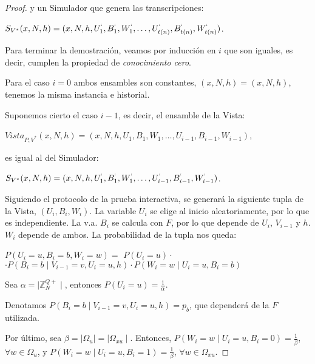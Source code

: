 \begin{proof}
	  y un Simulador que genera las transcripciones:
	  
	  \begin{center}
	  	$S_{V^*}(x,N,h)= (x,N,h,U_1^`,B_1^`,W_1^`,\dots , U_{t(n)}^`, B_{t(n)}^`, W_{t(n)}^`)$.
	  \end{center}
	
	Para terminar la demostración, veamos por inducción en $i$ que son iguales, es decir, cumplen la propiedad de \textit{conocimiento cero}.
	
	\hfil
	
	Para el caso $i=0$ ambos ensambles son constantes, $(x,N,h)=(x,N,h)$, tenemos la misma instancia e historial.
	
	\hfil
	
	Suponemos cierto el caso $i-1$, es decir, el ensamble de la Vista:
	
	 \begin{center}
		$Vista_{P,V^*}(x,N,h) = (x,N,h,U_1,B_1,W_1,\dots , U_{i-1}, B_{i-1}, W_{i-1})$,
	\end{center}
	
	es igual al del Simulador:
	
	\begin{center}
		$S_{V^*}(x,N,h)= (x,N,h,U_1^`,B_1^`,W_1^`,\dots , U_{i-1}^`, B_{i-1}^`, W_{i-1}^`)$.
	\end{center}
	
	\hfill

	Siguiendo el protocolo de la prueba interactiva, se generará la siguiente tupla de la Vista, $(U_i, B_i, W_i)$. La variable $U_i$ se elige al inicio aleatoriamente, por lo que es independiente. La v.a. $B_i$ se calcula con $F$, por lo que depende de $U_i$, $V_{i-1}$ y $h$. $W_i$ depende de ambos. La probabilidad de la tupla nos queda:
	
	\begin{flushleft}
		$P(U_i=u, B_i=b, W_i=w) = $ 	$P(U_i=u)\cdot$ \\ 
	 	$ \cdot P(B_i=b \mid V_{i-1}=v, U_i=u,h) \cdot P(W_i=w \mid U_i=u, B_i=b)$
	\end{flushleft}
	
	\hfil
	
	Sea $\alpha = \mid \mathbb{Z}^{Q+}_N \mid $, entonces $P(U_i=u) = \frac{1}{\alpha}$.
	
	Denotamos $ P(B_i=b \mid V_{i-1}=v, U_i=u,h)=p_b$, que dependerá de la $F$ utilizada.
	
	Por último, sea $\beta = \mid \Omega_u \mid = \mid \Omega_{xu} \mid $. Entonces, $P(W_i=w \mid U_i=u, B_i=0) = \frac{1}{\beta}$, $\forall w \in \Omega_u$, y $P(W_i=w \mid U_i=u, B_i=1) = \frac{1}{\beta}$, $\forall w \in \Omega_{xu}$.
	

\end{proof}
